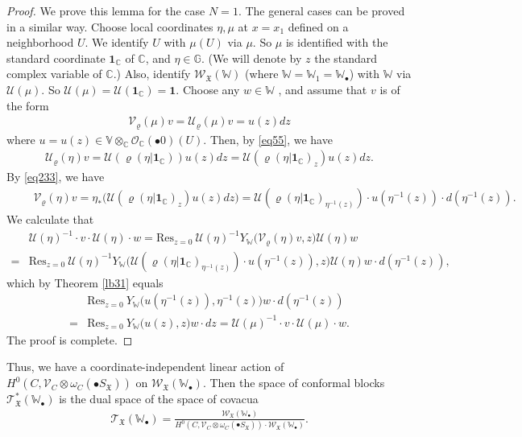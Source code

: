 \documentclass[12pt,b5paper,notitlepage]{report}
\theoremstyle{definition}
\theoremstyle{plain}
\newcommand{\fk}{\mathfrak}
\newcommand{\mc}{\mathcal}
\newcommand{\id}{\mathbf{1}}
\newcommand{\Res}{\mathrm{Res}}
\newcommand{\scr}{\mathscr}
\newcommand{\blt}{\bullet}
\newcommand{\Vbb}{\mathbb V}
\newcommand{\Wbb}{\mathbb W}
\newcommand{\Gbb}{\mathbb G}
\newcommand{\Cbb}{\mathbb C}
\numberwithin{equation}{section}
\begin{document}
\begin{proof}
We prove this lemma for the case $N=1$. The general cases can be proved in a similar way. Choose local coordinates $\eta,\mu$ at $x=x_1$ defined on a neighborhood $U$. We identify $U$ with $\mu(U)$ via $\mu$. So $\mu$  is identified with the standard coordinate $\id_\Cbb$ of $\Cbb$, and $\eta\in\Gbb$. (We will denote by $z$ the standard complex variable of $\Cbb$.) Also, identify $\scr W_{\fk X}(\Wbb)$ (where $\Wbb=\Wbb_1=\Wbb_\blt$) with $\Wbb$ via $\mc U(\mu)$. So $\mc U(\mu)=\mc U(\id_\Cbb)=\id$.  Choose any $w\in\Wbb$ , and assume that $v$ is of the form
\begin{gather*}
\mc V_\varrho(\mu)v=\mc U_\varrho(\mu)v=u(z)dz
\end{gather*}
where $u=u(z)\in\Vbb\otimes_\Cbb\scr O_\Cbb(\blt 0)(U)$. Then, by \eqref{eq55}, we have
\begin{gather*}
\mc U_\varrho(\eta)v=\mc U(\varrho(\eta|\id_\Cbb))u(z)dz=\mc U(\varrho(\eta|\id_\Cbb)_z)u(z)dz.
\end{gather*}
By \eqref{eq233}, we have
\begin{gather*}
\qquad \mc V_\varrho(\eta)v=\eta_*\big(\mc U(\varrho(\eta|\id_\Cbb)_z)u(z)dz \big)=\mc U(\varrho(\eta|\id_\Cbb)_{\eta^{-1}(z)})\cdot u(\eta^{-1}(z))\cdot d(\eta^{-1}(z)).
\end{gather*}
We calculate that
\begin{align*}
&\mc U(\eta)^{-1}\cdot v\cdot\mc U(\eta)\cdot w=\Res_{z=0}~\mc U(\eta)^{-1}Y_\Wbb\big(\mc V_\varrho(\eta)v,z\big)\mc U(\eta)w\\
=&\Res_{z=0}~\mc U(\eta)^{-1}Y_\Wbb\big(\mc U(\varrho(\eta|\id_\Cbb)_{\eta^{-1}(z)})\cdot u(\eta^{-1}(z)),z\big)\mc U(\eta)w\cdot d(\eta^{-1}(z)),
\end{align*}
which by Theorem \ref{lb31} equals
\begin{align*}
&\Res_{z=0}~Y_\Wbb\big( u(\eta^{-1}(z)),\eta^{-1}(z)\big)w\cdot d(\eta^{-1}(z))\\
=&\Res_{z=0}~Y_\Wbb\big( u(z),z\big)w\cdot dz=\mc U(\mu)^{-1}\cdot v\cdot\mc U(\mu)\cdot w.
\end{align*}
The proof is complete.
\end{proof}







Thus, we have a coordinate-independent linear action of $H^0(C,\scr V_C\otimes\omega_C(\blt S_{\fk X}))$ on $\scr W_{\fk X}(\Wbb_\blt)$. Then the space of conformal blocks $\scr T_{\fk X}^*(\Wbb_\blt)$ \index{T@$\scr T_{\fk X}(\Wbb_\blt),\scr T_{\fk X}^*(\Wbb_\blt)$} is the dual space of the space of covacua
\begin{gather}
\scr T_{\fk X}(\Wbb_\blt)=\frac{\scr W_{\fk X}(\Wbb_\blt)}{H^0(C,\scr V_C\otimes\omega_C(\blt S_{\fk X}))\cdot \scr W_{\fk X}(\Wbb_\blt)}.
\end{gather}
\end{document}
